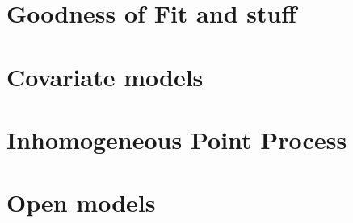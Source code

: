 \documentclass{book}
\begin{document}


\chapter{Goodness of Fit and stuff}
\label{chapt.gof}



\chapter{Covariate models}
\label{chapt.covariates}



\chapter{Inhomogeneous Point Process}
\label{chapt.ipp}

\chapter{Open models}
\label{chapt.open}






\printindex


\end{document}
